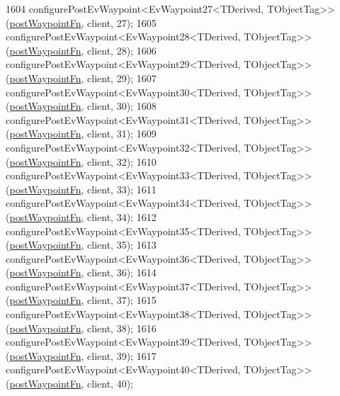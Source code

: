 \begin{DoxyCode}
1604     configurePostEvWaypoint<EvWaypoint27<TDerived, TObjectTag>>(\hyperlink{classmove__base__z__client_1_1WaypointEventDispatcher_acc538eb7506c13f7cca2268a1742dadd}{postWaypointFn}, client, 27);
1605     configurePostEvWaypoint<EvWaypoint28<TDerived, TObjectTag>>(\hyperlink{classmove__base__z__client_1_1WaypointEventDispatcher_acc538eb7506c13f7cca2268a1742dadd}{postWaypointFn}, client, 28);
1606     configurePostEvWaypoint<EvWaypoint29<TDerived, TObjectTag>>(\hyperlink{classmove__base__z__client_1_1WaypointEventDispatcher_acc538eb7506c13f7cca2268a1742dadd}{postWaypointFn}, client, 29);
1607     configurePostEvWaypoint<EvWaypoint30<TDerived, TObjectTag>>(\hyperlink{classmove__base__z__client_1_1WaypointEventDispatcher_acc538eb7506c13f7cca2268a1742dadd}{postWaypointFn}, client, 30);
1608     configurePostEvWaypoint<EvWaypoint31<TDerived, TObjectTag>>(\hyperlink{classmove__base__z__client_1_1WaypointEventDispatcher_acc538eb7506c13f7cca2268a1742dadd}{postWaypointFn}, client, 31);
1609     configurePostEvWaypoint<EvWaypoint32<TDerived, TObjectTag>>(\hyperlink{classmove__base__z__client_1_1WaypointEventDispatcher_acc538eb7506c13f7cca2268a1742dadd}{postWaypointFn}, client, 32);
1610     configurePostEvWaypoint<EvWaypoint33<TDerived, TObjectTag>>(\hyperlink{classmove__base__z__client_1_1WaypointEventDispatcher_acc538eb7506c13f7cca2268a1742dadd}{postWaypointFn}, client, 33);
1611     configurePostEvWaypoint<EvWaypoint34<TDerived, TObjectTag>>(\hyperlink{classmove__base__z__client_1_1WaypointEventDispatcher_acc538eb7506c13f7cca2268a1742dadd}{postWaypointFn}, client, 34);
1612     configurePostEvWaypoint<EvWaypoint35<TDerived, TObjectTag>>(\hyperlink{classmove__base__z__client_1_1WaypointEventDispatcher_acc538eb7506c13f7cca2268a1742dadd}{postWaypointFn}, client, 35);
1613     configurePostEvWaypoint<EvWaypoint36<TDerived, TObjectTag>>(\hyperlink{classmove__base__z__client_1_1WaypointEventDispatcher_acc538eb7506c13f7cca2268a1742dadd}{postWaypointFn}, client, 36);
1614     configurePostEvWaypoint<EvWaypoint37<TDerived, TObjectTag>>(\hyperlink{classmove__base__z__client_1_1WaypointEventDispatcher_acc538eb7506c13f7cca2268a1742dadd}{postWaypointFn}, client, 37);
1615     configurePostEvWaypoint<EvWaypoint38<TDerived, TObjectTag>>(\hyperlink{classmove__base__z__client_1_1WaypointEventDispatcher_acc538eb7506c13f7cca2268a1742dadd}{postWaypointFn}, client, 38);
1616     configurePostEvWaypoint<EvWaypoint39<TDerived, TObjectTag>>(\hyperlink{classmove__base__z__client_1_1WaypointEventDispatcher_acc538eb7506c13f7cca2268a1742dadd}{postWaypointFn}, client, 39);
1617     configurePostEvWaypoint<EvWaypoint40<TDerived, TObjectTag>>(\hyperlink{classmove__base__z__client_1_1WaypointEventDispatcher_acc538eb7506c13f7cca2268a1742dadd}{postWaypointFn}, client, 40);

\end{DoxyCode}
